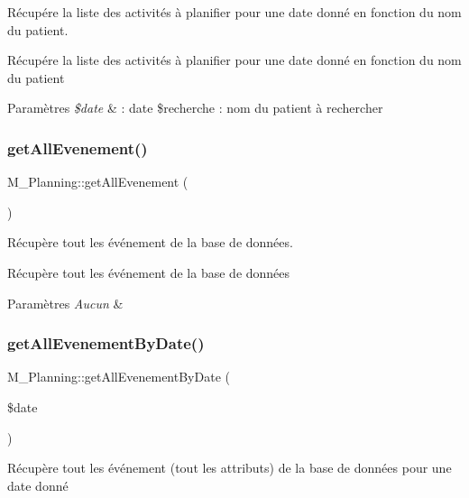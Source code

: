 Récupére la liste des activités à planifier pour une date donné en fonction du nom du patient. 

Récupére la liste des activités à planifier pour une date donné en fonction du nom du patient 
\begin{DoxyParams}{Paramètres}
{\em \$date} & \+: date \$recherche \+: nom du patient à rechercher \\
\hline
\end{DoxyParams}
\mbox{\label{class_m___planning_adaed7f7dad15559184206d3705a9f78a}} 
\subsubsection{\texorpdfstring{get\+All\+Evenement()}{getAllEvenement()}}
{\footnotesize\ttfamily M\+\_\+\+Planning\+::get\+All\+Evenement (\begin{DoxyParamCaption}{ }\end{DoxyParamCaption})}



Récupère tout les événement de la base de données. 

Récupère tout les événement de la base de données 
\begin{DoxyParams}{Paramètres}
{\em Aucun} & \\
\hline
\end{DoxyParams}
\mbox{\label{class_m___planning_ab41d539962a52545111d136aff324ea6}} 
\subsubsection{\texorpdfstring{get\+All\+Evenement\+By\+Date()}{getAllEvenementByDate()}}
{\footnotesize\ttfamily M\+\_\+\+Planning\+::get\+All\+Evenement\+By\+Date (\begin{DoxyParamCaption}\item[{}]{\$date }\end{DoxyParamCaption})}



Récupère tout les événement (tout les attributs) de la base de données pour une date donné 

